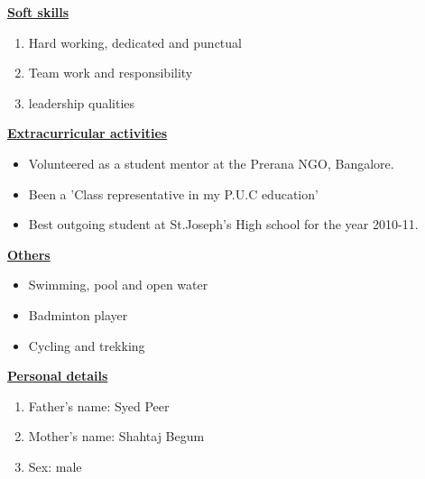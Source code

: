 \documentclass[10pt]{article}
\begin{document}
			\underline{\textbf{\Large{Soft skills}}}
			\begin{enumerate}
				\item{Hard working, dedicated and punctual}
				\item{Team work and responsibility}
				\item{leadership qualities} 
				
			\end{enumerate}
			
			\hfill
			
		\underline{\textbf{\Large{Extracurricular activities}}}
		\begin{itemize}
			\item{Volunteered as a student mentor at the Prerana NGO, Bangalore.}
			\item{Been a 'Class representative in my P.U.C education'}
			\item{Best outgoing student at St.Joseph's High school for the year 2010-11.}
			
		\end{itemize}
		
		\hfill
		
			\underline{\textbf{\Large{Others}}}
			\begin{itemize}
				\item{Swimming, pool and open water}
				\item{Badminton player}
				\item{Cycling and trekking}					
				
			\end{itemize}
			
			\hfill
			
				\underline{\textbf{\Large{Personal details}}}
				\begin{enumerate}
					\item{Father's name: Syed Peer}
					\item{Mother's name: Shahtaj Begum}
					\item{Sex: male} 
					
				\end{enumerate}
				
				\hfill
	
\end{document}
